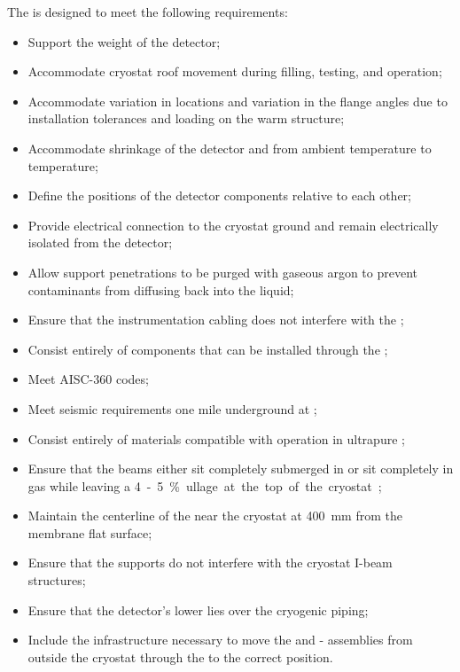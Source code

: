 The  is designed to meet the following  requirements:
\begin{itemize}
 \setlength\itemsep{1mm}
\setlength{\parsep}{1mm}
\setlength{\itemsep}{-5mm}
\item Support the weight of the detector;
\item Accommodate cryostat roof movement during filling, testing, and operation;
\item Accommodate variation in \fdth locations and
  variation in the flange angles due to installation tolerances and
  loading on the warm structure;
\item Accommodate shrinkage of the detector and  from ambient
  temperature to  temperature;
\item Define the positions of the detector components relative to each other; 
\item Provide electrical connection to the cryostat ground and remain electrically isolated from the detector;
\item Allow support penetrations to be purged with gaseous argon to prevent contaminants from diffusing back into the liquid; 
\item Ensure that the instrumentation cabling does not interfere with the ;
\item Consist entirely of components that can  
be installed through the ;
\item Meet AISC-360 codes; 
\item Meet seismic requirements one mile underground at ;
\item Consist entirely of materials compatible %
with operation in ultrapure ;
\item Ensure that the  beams either sit completely submerged in  or sit completely in gas while leaving a \SI{4}-\SI{5}{\%} ullage at the top of the cryostat;  
\item Maintain the centerline of the  near the cryostat at \SI{400}{mm} from the membrane flat surface;
\item Ensure that the supports do not interfere with the cryostat I-beam structures;
\item Ensure that the detector's lower  lies over the cryogenic piping;
\item Include the infrastructure necessary to move the  and - assemblies from outside the cryostat through the  to the correct position.
\end{itemize}

